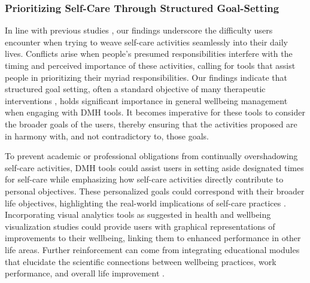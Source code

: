 \subsubsection{Prioritizing Self-Care Through Structured Goal-Setting}

In line with previous studies \cite{bhattacharjee2022kind, brown2014health, chaudhry2022formative, jardine2023between, epstein2015lived}, our findings underscore the difficulty users encounter when trying to weave self-care activities seamlessly into their daily lives. Conflicts arise when people's presumed responsibilities interfere with the timing and perceived importance of these activities, calling for tools that assist people in prioritizing their myriad responsibilities. Our findings indicate that structured goal setting, often a standard objective of many therapeutic interventions \cite{chand2023cognitive, agapie2022longitudinal, epstein2015lived}, holds significant importance in general wellbeing management when engaging with DMH tools. It becomes imperative for these tools to consider the broader goals of the users, thereby ensuring that the activities proposed are in harmony with, and not contradictory to, those goals. 

To prevent academic or professional obligations from continually overshadowing self-care activities, DMH tools could assist users in setting aside designated times for self-care while emphasizing how self-care activities directly contribute to personal objectives. These personalized goals could correspond with their broader life objectives, highlighting the real-world implications of self-care practices \cite{jennings2018personalized, lindhiem2016meta, agapie2022longitudinal, epstein2015lived}. Incorporating visual analytics tools as suggested in health and wellbeing visualization studies \cite{baumer2014reviewing, kocielnik2018reflection} could provide users with graphical representations of improvements to their wellbeing, linking them to enhanced performance in other life areas. Further reinforcement can come from integrating educational modules that elucidate the scientific connections between wellbeing practices, work performance, and overall life improvement \cite{howe2022design, bhattacharjee2023understanding}. %

